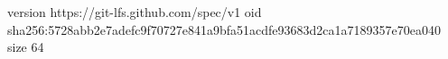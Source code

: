 version https://git-lfs.github.com/spec/v1
oid sha256:5728abb2e7adefc9f70727e841a9bfa51acdfe93683d2ca1a7189357e70ea040
size 64

